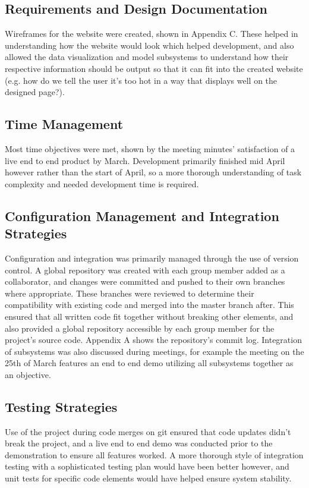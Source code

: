 \documentclass[]{report}
\begin{document}
	\subsection{Requirements and Design Documentation}
	Wireframes for the website were created, shown in Appendix C. These helped in understanding how the website would look which helped development, and also allowed the data visualization and model subsystems to understand how their respective information should be output so that it can fit into the created website (e.g. how do we tell the user it's too hot in a way that displays well on the designed page?).
	
	\subsection{Time Management}
	Most time objectives were met, shown by the meeting minutes' satisfaction of a live end to end product by March. Development primarily finished mid April however rather than the start of April, so a more thorough understanding of task complexity and needed development time is required.
	
	\subsection{Configuration Management and Integration Strategies}
	Configuration and integration was primarily managed through the use of version control. A global repository was created with each group member added as a collaborator, and changes were committed and pushed to their own branches where appropriate. These branches were reviewed to determine their compatibility with existing code and merged into the master branch after. This ensured that all written code fit together without breaking other elements, and also provided a global repository accessible by each group member for the project's source code. Appendix A shows the repository's commit log. Integration of subsystems was also discussed during meetings, for example the meeting on the 25th of March features an end to end demo utilizing all subsystems together as an objective.
	
	\subsection{Testing Strategies}
	Use of the project during code merges on git ensured that code updates didn't break the project, and a live end to end demo was conducted prior to the demonstration to ensure all features worked. A more thorough style of integration testing with a sophisticated testing plan would have been better however, and unit tests for specific code elements would have helped ensure system stability.
	
\end{document}
